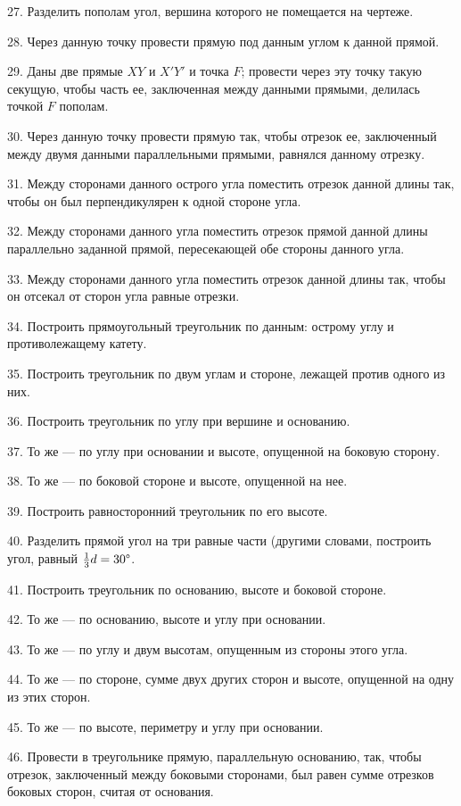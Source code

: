 \documentclass[oneside]{book}
\begin{document}
27.
Разделить пополам угол, вершина которого не помещается на чертеже.

28.
Через данную точку провести прямую под данным углом к данной прямой.

29.
Даны две прямые $XY$ и $X'Y'$ и точка $F$;
провести через эту точку такую секущую, чтобы часть ее, заключенная между данными прямыми, делилась точкой $F$ пополам.

30.
Через данную точку провести прямую так, чтобы отрезок ее, заключенный между двумя данными параллельными прямыми, равнялся данному отрезку.

31.
Между сторонами данного острого угла поместить отрезок данной длины так, чтобы он был перпендикулярен к одной стороне угла.

32.
Между сторонами данного угла поместить отрезок прямой данной длины параллельно заданной прямой, пересекающей обе стороны данного угла.

33.
Между сторонами данного угла поместить отрезок данной длины так, чтобы он отсекал от сторон угла равные отрезки.

34.
Построить прямоугольный треугольник по данным:
острому углу и противолежащему катету.

35.
Построить треугольник по двум углам и стороне, лежащей против одного из них.

36.
Построить  треугольник по углу при вершине и основанию.


37.
То же — по углу при основании и высоте, опущенной на боковую сторону.

38.
То же — по боковой стороне и высоте, опущенной на нее.

39.
Построить равносторонний треугольник по его высоте.

40.
Разделить прямой угол на три равные части (другими словами, построить угол, равный  $\tfrac13d=30\degree$.

41.
Построить треугольник по основанию, высоте и боковой стороне.

42.
То же — по основанию, высоте и углу при основании.

43.
То же — по углу и двум высотам, опущенным из стороны этого угла.

44.
То же — по стороне, сумме двух других сторон и высоте, опущенной на одну из этих сторон.

45.
То же — по высоте, периметру и углу при основании.

46.
Провести в треугольнике прямую, параллельную основанию, так, чтобы отрезок, заключенный между боковыми сторонами, был равен сумме отрезков боковых сторон, считая от основания.
\end{document}
